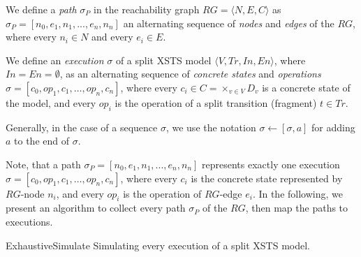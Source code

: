 \begin{definition}[Path]
We define a \emph{path} $\sigma_P$ in the reachability graph $RG = \langle N, E, C \rangle$ as $\sigma_P = [n_0, e_1, n_1, ..., e_n, n_n]$ an alternating sequence of \emph{nodes} and \emph{edges} of the $RG$, where every $n_i \in N$ and every $e_i \in E$.
\end{definition}

\begin{definition}[Execution]
We define an \emph{execution} $\sigma$ of a split XSTS model $\langle V, Tr, In, En \rangle$, where $In = En = \emptyset$, as an alternating sequence of \emph{concrete states} and \emph{operations} $\sigma = [c_0, op_1, c_1, \ldots, op_n, c_n]$, where every $c_i \in C = \times_{v \in V} D_v$ is a concrete state of the model, and every $op_i$ is the operation of a split transition (fragment) $t \in Tr$.
\end{definition}

Generally, in the case of a sequence $\sigma$, we use the notation $\sigma \leftarrow [\sigma, a]$ for adding $a$ to the end of $\sigma$.

Note, that a path $\sigma_P = [n_0, e_1, n_1, ..., e_n, n_n]$ represents exactly one execution $\sigma = [c_0, op_1, c_1, \ldots, op_n, c_n]$, where every $c_i$ is the concrete state represented by $RG$-node $n_i$, and every $op_i$ is the operation of $RG$-edge $e_i$. In the following, we present an algorithm to collect every path $\sigma_P$ of the $RG$, then map the paths to executions.

\begin{algorithm}[t]
\DontPrintSemicolon
\caption{{\sc ExhaustiveSimulate} Simulating every execution of a split XSTS model.} \label{alg:sim-exhaustive}

\end{algorithm}

